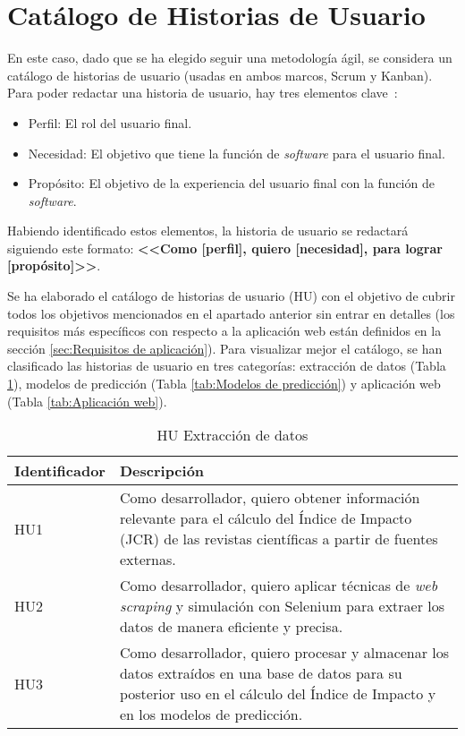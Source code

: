 \section{Catálogo de Historias de Usuario}
\label{sec:Catálogo de requisitos}

En este caso, dado que se ha elegido seguir una metodología ágil, se considera un catálogo de historias de usuario (usadas en ambos marcos, Scrum y Kanban). Para poder redactar una historia de usuario, hay tres elementos clave~\cite{Asana_2022}:
\begin{itemize}
    \item Perfil: El rol del usuario final.
    \item Necesidad: El objetivo que tiene la función de \textit{software} para el usuario final.
    \item Propósito: El objetivo de la experiencia del usuario final con la función de \textit{software}.
\end{itemize}

Habiendo identificado estos elementos, la historia de usuario se redactará siguiendo este formato: \textbf{<<Como [perfil], quiero [necesidad], para lograr [propósito]>>}.

Se ha elaborado el catálogo de historias de usuario (HU) con el objetivo de cubrir todos los objetivos mencionados en el apartado anterior sin entrar en detalles (los requisitos más específicos con respecto a la aplicación web están definidos en la sección \ref{sec:Requisitos de aplicación}). Para visualizar mejor el catálogo, se han clasificado las historias de usuario en tres categorías: extracción de datos (Tabla \ref{tab:extracción_de_datos}), modelos de predicción  (Tabla \ref{tab:Modelos de predicción}) y aplicación web (Tabla \ref{tab:Aplicación web}).

\begin{table}[h]
\centering
\begin{tabular}{p{3cm}p{8cm}}
\toprule
\textbf{Identificador} & \textbf{Descripción} \\
\toprule
HU1 & Como desarrollador, quiero obtener información relevante para el cálculo del Índice de Impacto (JCR) de las revistas científicas a partir de fuentes externas. \\
\midrule
HU2 & Como desarrollador, quiero aplicar técnicas de \textit{web scraping} y simulación con Selenium para extraer los datos de manera eficiente y precisa. \\
\midrule
HU3 & Como desarrollador, quiero procesar y almacenar los datos extraídos en una base de datos para su posterior uso en el cálculo del Índice de Impacto y en los modelos de predicción. \\
\bottomrule
\end{tabular}
\caption{HU Extracción de datos}
\label{tab:extracción_de_datos}
\end{table}
\newpage


